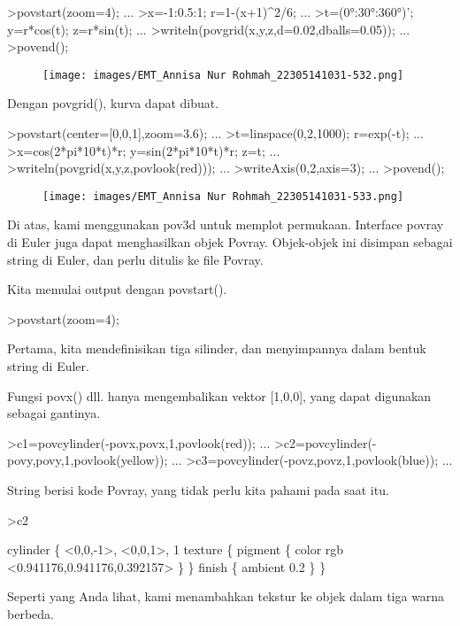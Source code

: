\documentclass[a4paper,10pt]{article}
\begin{document}
\begin{eulernotebook}
\begin{eulerprompt}
>povstart(zoom=4); ...
>x=-1:0.5:1; r=1-(x+1)^2/6; ...
>t=(0°:30°:360°)'; y=r*cos(t); z=r*sin(t); ...
>writeln(povgrid(x,y,z,d=0.02,dballs=0.05)); ...
>povend();
\end{eulerprompt}
\begin{figure}[h]
    \centering
    \texttt{[image: images/EMT\_Annisa Nur Rohmah\_22305141031-532.png]}
\end{figure}
\begin{eulercomment}
Dengan povgrid(), kurva dapat dibuat.
\end{eulercomment}
\begin{eulerprompt}
>povstart(center=[0,0,1],zoom=3.6); ...
>t=linspace(0,2,1000); r=exp(-t); ...
>x=cos(2*pi*10*t)*r; y=sin(2*pi*10*t)*r; z=t; ...
>writeln(povgrid(x,y,z,povlook(red))); ...
>writeAxis(0,2,axis=3); ...
>povend();
\end{eulerprompt}
\begin{figure}[h]
    \centering
    \texttt{[image: images/EMT\_Annisa Nur Rohmah\_22305141031-533.png]}
\end{figure}
\begin{eulercomment}
Di atas, kami menggunakan pov3d untuk memplot permukaan. Interface
povray di Euler juga dapat menghasilkan objek Povray. Objek-objek ini
disimpan sebagai string di Euler, dan perlu ditulis ke file Povray.

Kita memulai output dengan povstart().
\end{eulercomment}
\begin{eulerprompt}
>povstart(zoom=4);
\end{eulerprompt}
\begin{eulercomment}
Pertama, kita mendefinisikan tiga silinder, dan menyimpannya dalam
bentuk string di Euler.

Fungsi povx() dll. hanya mengembalikan vektor [1,0,0], yang dapat
digunakan sebagai gantinya.
\end{eulercomment}
\begin{eulerprompt}
>c1=povcylinder(-povx,povx,1,povlook(red)); ...
>c2=povcylinder(-povy,povy,1,povlook(yellow)); ...
>c3=povcylinder(-povz,povz,1,povlook(blue)); ...
\end{eulerprompt}
\begin{eulercomment}
String berisi kode Povray, yang tidak perlu kita pahami pada saat itu.
\end{eulercomment}
\begin{eulerprompt}
>c2
\end{eulerprompt}
\begin{euleroutput}
  cylinder \{ <0,0,-1>, <0,0,1>, 1
   texture \{ pigment \{ color rgb <0.941176,0.941176,0.392157> \}  \} 
   finish \{ ambient 0.2 \} 
   \}
\end{euleroutput}
\begin{eulercomment}
Seperti yang Anda lihat, kami menambahkan tekstur ke objek dalam tiga
warna berbeda.


\end{eulercomment}
\end{eulernotebook}
\end{document}
